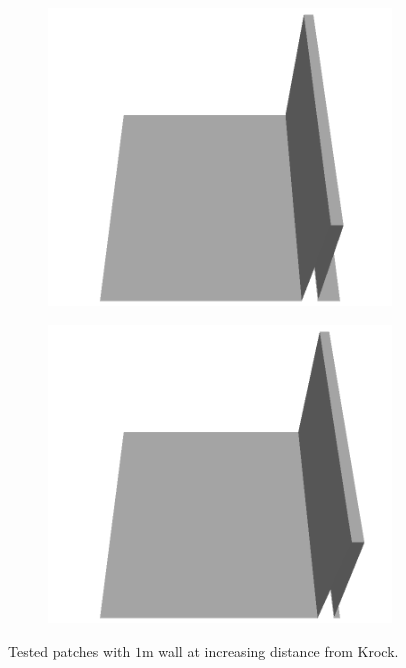 \documentclass[../document.tex]{subfiles}
\begin{document}
\begin{figure}[H]
\begin{subfigure}[b]{0.160\textwidth}
    \includegraphics[width=\linewidth]{../img/5/custom_patches/walls_front/all/15-3d.png}
    \end{subfigure}
    \begin{subfigure}[b]{0.160\textwidth}
    \includegraphics[width=\linewidth]{../img/5/custom_patches/walls_front/all/05-3d.png}
    \end{subfigure}
    \caption{Tested patches with $1$m wall at increasing distance from Krock.}
    \end{figure}
\end{document}
